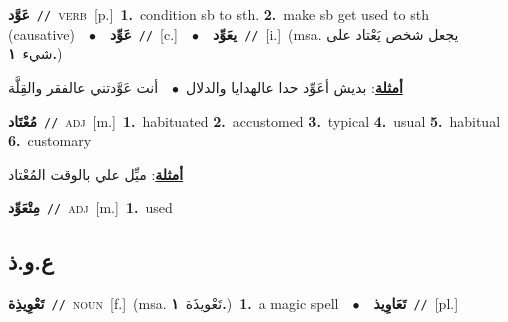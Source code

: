\documentclass[10pt,a4paper,twoside]{article} %
\begin{document}
\begin{multicols}{2}
{\setlength\topsep{0pt}\textbf{\foreignlanguage{arabic}{عَوَّد}}\ {\color{gray}\texttt{//}\color{black}}\ \textsc{verb}\ [p.]\ \textbf{1.}~condition sb to sth.  \textbf{2.}~make sb get used to sth (causative)\ \ $\bullet$\ \ \setlength\topsep{0pt}\textbf{\foreignlanguage{arabic}{عَوِّد}}\ {\color{gray}\texttt{//}\color{black}}\ [c.]\ \ $\bullet$\ \ \setlength\topsep{0pt}\textbf{\foreignlanguage{arabic}{يعَوِّد}}\ {\color{gray}\texttt{//}\color{black}}\ [i.]\ \color{gray}(msa. \foreignlanguage{arabic}{يجعل شخص يَعْتاد على شيء}~\foreignlanguage{arabic}{\textbf{١.}})\color{black}\  \begin{flushright}\color{gray}\foreignlanguage{arabic}{\textbf{\underline{\foreignlanguage{arabic}{أمثلة}}}: بديش أعَوِّد حدا عالهدايا والدلال\ $\bullet$\ \  أنت عَوَّدتني عالفقر والقِلَّة}\end{flushright}\color{black}} \vspace{2mm}

{\setlength\topsep{0pt}\textbf{\foreignlanguage{arabic}{مُعْتَاد}}\ {\color{gray}\texttt{//}\color{black}}\ \textsc{adj}\ [m.]\ \textbf{1.}~habituated  \textbf{2.}~accustomed  \textbf{3.}~typical  \textbf{4.}~usual  \textbf{5.}~habitual  \textbf{6.}~customary\  \begin{flushright}\color{gray}\foreignlanguage{arabic}{\textbf{\underline{\foreignlanguage{arabic}{أمثلة}}}: ميِّل علي بالوقت المُعْتاد}\end{flushright}\color{black}} \vspace{2mm}

{\setlength\topsep{0pt}\textbf{\foreignlanguage{arabic}{مِتْعَوِّد}}\ {\color{gray}\texttt{//}\color{black}}\ \textsc{adj}\ [m.]\ \textbf{1.}~used\ } \vspace{2mm}

\vspace{-3mm}
\subsection*{\color{blue}\foreignlanguage{arabic}{ع.و.ذ}\color{blue}{}} 

{\setlength\topsep{0pt}\textbf{\foreignlanguage{arabic}{تَعْوِيذِة}}\ {\color{gray}\texttt{//}\color{black}}\ \textsc{noun}\ [f.]\ \color{gray}(msa. \foreignlanguage{arabic}{تَعْويذَة}~\foreignlanguage{arabic}{\textbf{١.}})\color{black}\ \textbf{1.}~a magic spell\ \ $\bullet$\ \ \setlength\topsep{0pt}\textbf{\foreignlanguage{arabic}{تَعَاوِيذ}}\ {\color{gray}\texttt{//}\color{black}}\ [pl.]\ } \vspace{2mm}


\end{multicols}
\end{document}
